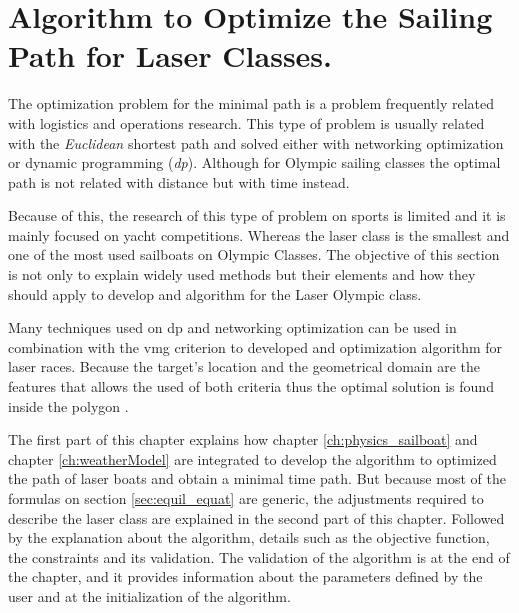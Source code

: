 \chapter{Algorithm to Optimize the Sailing Path for Laser Classes.} \label{sec:AlgOptSail}
The optimization problem for the minimal path is a problem frequently related with logistics and operations research. This type of problem is usually related with the \textit{Euclidean} shortest path and solved either with networking optimization or dynamic programming (\textit{\acrshort{dp}}). Although for Olympic sailing classes the optimal path is not related with distance but with time instead. \par \noindent 
Because of this, the research of this type of problem on sports is limited and it is mainly focused on yacht competitions. Whereas the laser class is the smallest and one of the most used sailboats on Olympic Classes. The objective of this section is not only to explain widely used methods but their elements and how they should apply to develop and algorithm for the Laser Olympic class.\par

Many techniques used on \acrshort{dp} and networking optimization can be used in combination with the \acrshort{vmg} criterion to developed and optimization algorithm for laser races.  Because the target's location and the geometrical domain are the features that allows the used of both criteria thus the optimal solution is found inside the polygon \cite{mitchell2000geometric}.\par 

The first part of this chapter explains how chapter \ref{ch:physics_sailboat} and chapter \ref{ch:weatherModel} are integrated to develop the algorithm to optimized the path of laser boats and obtain a minimal time path. But because most of the formulas on section \ref{sec:equil_equat} are generic, the adjustments required to describe the laser class are explained in the second part of this chapter. Followed by the explanation about the algorithm, details such as the objective function, the constraints and its validation. The validation of the algorithm is at the end of the chapter, and it provides information about the parameters defined by the user and at the initialization of the algorithm. \par 

